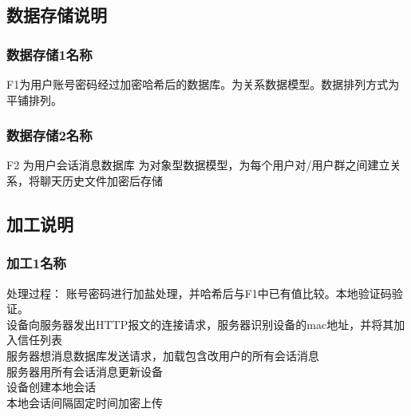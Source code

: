 \subsection{数据存储说明}
\subsubsection{数据存储1名称}
\iffalse
<Title of  the data flow should accord with the one in data flow diagram, and the Data description notions should be used. The arrangement of the data in data store should also be described.>

与数据流图中的名称一致，采用数据描述符号说明数据流的内容，另外还需描述数据排列方式
\fi
F1为用户账号密码经过加密哈希后的数据库。为关系数据模型。数据排列方式为平铺排列。
\subsubsection{数据存储2名称}
\iffalse
<Title of  the data flow should accord with the one in data flow diagram, and the Data description notions should be used.The arrangement of the data in data store should also be described.>

与数据流图中的名称一致，采用数据描述符号说明数据流的内容，另外还需描述数据排列方式
\fi
F2 为用户会话消息数据库
为对象型数据模型，为每个用户对/用户群之间建立关系，将聊天历史文件加密后存储
\subsection{加工说明}
\subsubsection{加工1名称}
\iffalse
<Use natural language, Decision table/Decision tree and Pseudocode to describe how to process the data flow>

采用自然语言，判断表/判断树，伪码的形式描述对数据流进行处理的过程
\fi
处理过程：
账号密码进行加盐处理，并哈希后与F1中已有值比较。本地验证码验证。\\
设备向服务器发出HTTP报文的连接请求，服务器识别设备的mac地址，并将其加入信任列表\\
服务器想消息数据库发送请求，加载包含改用户的所有会话消息\\
服务器用所有会话消息更新设备\\
设备创建本地会话\\
本地会话间隔固定时间加密上传\\

